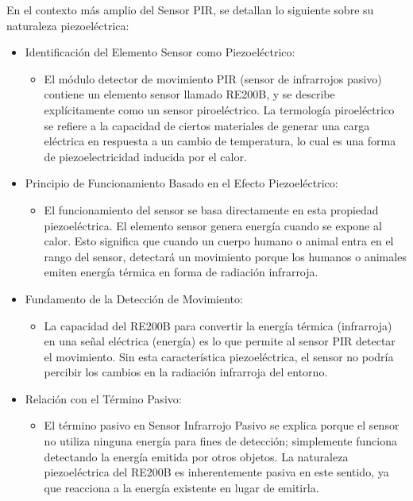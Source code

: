 \documentclass{report}
\begin{document}
En el contexto más amplio del Sensor PIR, se  detallan lo siguiente sobre su naturaleza piezoeléctrica:
\begin{itemize}
    \item Identificación del Elemento Sensor como Piezoeléctrico:
    \begin{itemize}
        \item El módulo detector de movimiento PIR (sensor de infrarrojos pasivo) contiene un elemento sensor llamado RE200B, y se describe explícitamente 
        como un sensor piroeléctrico. La termología piroeléctrico se refiere a la capacidad de ciertos materiales de generar una carga eléctrica en 
        respuesta a un cambio de temperatura, lo cual es una forma de piezoelectricidad inducida por el calor.
    \end{itemize}
    \item Principio de Funcionamiento Basado en el Efecto Piezoeléctrico:
    \begin{itemize}
        \item El funcionamiento del sensor se basa directamente en esta propiedad piezoeléctrica. El elemento sensor genera energía cuando se expone al calor. 
        Esto significa que cuando un cuerpo humano o animal entra en el rango del sensor, detectará un movimiento porque los humanos o animales emiten 
        energía térmica en forma de radiación infrarroja.
    \end{itemize}
    \item Fundamento de la Detección de Movimiento:
    \begin{itemize}
        \item La capacidad del RE200B para convertir la energía térmica (infrarroja) en una señal eléctrica (energía) es lo que permite al sensor PIR 
        detectar el movimiento. Sin esta característica piezoeléctrica, el sensor no podría percibir los cambios en la radiación infrarroja del entorno.
    \end{itemize}
    \item Relación con el Término Pasivo:
    \begin{itemize}
        \item El término pasivo en Sensor Infrarrojo Pasivo se explica porque el sensor no utiliza ninguna energía para fines de detección; simplemente 
        funciona detectando la energía emitida por otros objetos. La naturaleza piezoeléctrica del RE200B es inherentemente pasiva en este sentido, ya 
        que reacciona a la energía existente en lugar de emitirla.
    \end{itemize}
\end{itemize}
\end{document}
